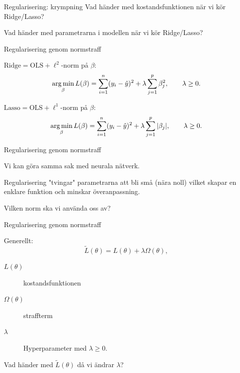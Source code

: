 \documentclass[10pt,english]{beamer}
\begin{document}
\begin{frame}{Regularisering: krympning}
    Vad händer med kostandsfunktionen när vi kör Ridge/Lasso?
    
    Vad händer med parametrarna i modellen när vi kör Ridge/Lasso?

\end{frame}

\begin{frame}{Regularisering genom normstraff}
    
    $\text{Ridge} = \text{OLS} + \ell^2$-norm på $\beta$:
    \begin{equation*}
        \operatorname*{arg\,min}_{\beta} L(\beta) = \sum_{i=1}^{n}(y_i - \hat{y})^2 + \lambda \sum_{j=1}^{p} \beta_{j}^2, \qquad \lambda \geq 0.
    \end{equation*}


    $\text{Lasso} = \text{OLS} + \ell^1$-norm på $\beta$:
    \begin{equation*}
        \operatorname*{arg\,min}_{\beta} L(\beta) = \sum_{i=1}^{n}(y_i - \hat{y})^2 + \lambda \sum_{j=1}^{p} |\beta_{j}|, \qquad \lambda \geq 0.
    \end{equation*}
\end{frame}

\begin{frame}{Regularisering genom normstraff}
    
    Vi kan göra samma sak med neurala nätverk.

    Regularisering "tvingar" parametrarna att bli små (nära noll) vilket skapar en enklare funktion och minskar överanpassning.

    Vilken norm ska vi använda oss av?

\end{frame}

\begin{frame}{Regularisering genom normstraff}
    
    Generellt:
    \begin{equation*}
        \tilde{L}(\theta) = L(\theta) + \lambda \Omega(\theta),
    \end{equation*}
    \begin{description}
        \item[$L(\theta)$] kostandsfunktionen
        \item[$\Omega(\theta)$] straffterm
        \item[$\lambda$] Hyperparameter med $\lambda \geq 0$.   
    \end{description}

    Vad händer med  $\tilde{L}(\theta)$ då vi ändrar $\lambda$?

\end{frame}
\end{document}
